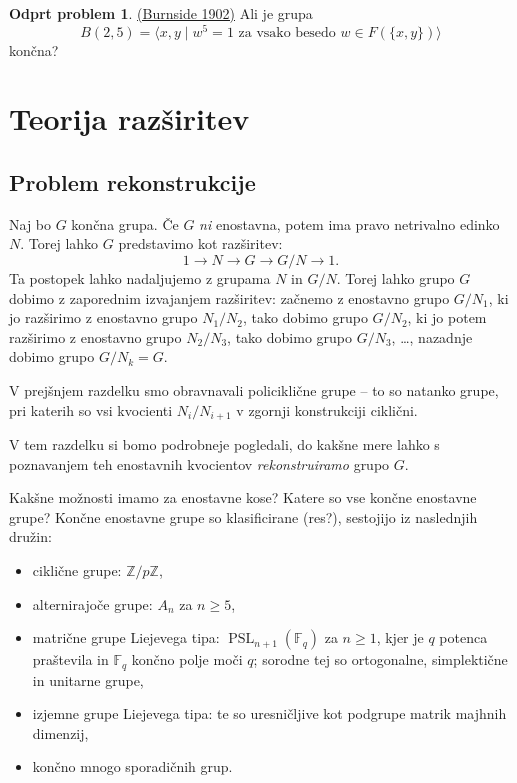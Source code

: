 \documentclass[11pt]{book}
\def\ZZ{\mathbb{Z}}
\def\field{\mathbb{F}}
\DeclareMathOperator\PSL{PSL}
\def\vprasanje{\color{oranzna}}
\theoremstyle{definition}
\theoremstyle{zgled}
\theoremstyle{odprtproblem}
\newtheorem*{odprtproblem}{Odprt problem}
\theoremstyle{domacanaloga}
\theoremstyle{izrek}
\begin{document}
\begin{odprtproblem}\href{https://en.wikipedia.org/wiki/Burnside_problem}{(Burnside 1902)}
Ali je grupa 
\[
B(2,5) = \langle x, y \mid w^5 = 1 \text{ za vsako besedo $w \in F(\{ x, y \})$} \rangle
\]
končna?
\end{odprtproblem}

\section{Teorija razširitev}

\subsection{Problem rekonstrukcije}

Naj bo $G$ končna grupa. Če $G$ {\em ni} enostavna, potem ima pravo netrivalno edinko $N$. Torej lahko $G$ predstavimo kot razširitev:
\[
1 \to N \to G \to G/N \to 1.
\]
Ta postopek lahko nadaljujemo z grupama $N$ in $G/N$. Torej lahko grupo $G$ dobimo z zaporednim izvajanjem razširitev: začnemo z enostavno grupo $G/N_1$, ki jo razširimo z enostavno grupo $N_1/N_2$, tako dobimo grupo $G/N_2$, ki jo potem razširimo z enostavno grupo $N_2/N_3$, tako dobimo grupo $G/N_3$, \dots, nazadnje dobimo grupo $G/N_k = G$.

V prejšnjem razdelku smo obravnavali policiklične grupe -- to so natanko grupe, pri katerih so vsi kvocienti $N_i/N_{i+1}$ v zgornji konstrukciji ciklični.

V tem razdelku si bomo podrobneje pogledali, do kakšne mere lahko s poznavanjem teh enostavnih kvocientov {\em rekonstruiramo} grupo $G$.

{\vprasanje Kakšne možnosti imamo za enostavne kose? Katere so vse končne enostavne grupe?} Končne enostavne grupe so klasificirane ({\vprasanje res?}), sestojijo iz naslednjih družin:
\begin{itemize}
    \item ciklične grupe: $\ZZ/p\ZZ$,
    \item alternirajoče grupe: $A_n$ za $n \geq 5$,
    \item matrične grupe Liejevega tipa: $\PSL_{n+1}(\field_q)$ za $n \geq 1$, kjer je $q$ potenca praštevila in $\field_q$ končno polje moči $q$; sorodne tej so ortogonalne, simplektične in unitarne grupe,
    \item izjemne grupe Liejevega tipa: te so uresničljive kot podgrupe matrik majhnih dimenzij,
    \item končno mnogo sporadičnih grup.
\end{itemize}
\end{document}
